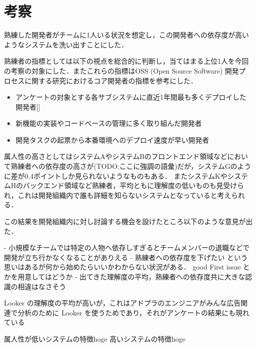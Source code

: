\section{考察}

熟練した開発者がチームに1人いる状況を想定し，この開発者への依存度が高いようなシステムを洗い出すことにした．

熟練者の指標としては以下の視点を総合的に判断し，当てはまる上位1人を今回の考察の対象にした．またこれらの指標はOSS (Open Source Software) 開発プロセスに関する研究\cite{bib:mockus}におけるコア開発者の指標を参考にした．
\begin{itemize}
	\item アンケートの対象とする各サブシステムに直近1年間最も多くデプロイした開発者[]
	\item 新機能の実装やコードベースの管理に多く取り組んだ開発者
	\item 開発タスクの起票から本番環境へのデプロイ速度が早い開発者
\end{itemize}


属人性の高さとしてはシステムAやシステムBのフロントエンド領域などにおいて熟練者への依存度の高さが(TODO:ここに強調の語彙)だが，システムGのように差が0.4ポイントしか見られないようなものもある．
またシステムKやシステムHのバックエンド領域など熟練者，平均ともに理解度の低いものも見受けられ，これは開発組織内で誰も詳細を知らないシステムとなっていると考えられる．

この結果を開発組織内に対し討論する機会を設けたところ以下のような意見が出た．

- 小規模なチームでは特定の人物へ依存しすぎるとチームメンバーの退職などで開発が立ち行かなくなることがありえる
- 熟練者への依存度を下げたい という思いはあるが何から始めたらいいかわからない状況がある． good First issue とかを用意してはどうか
- 出てきた理解度の平均，熟練者への依存度共に大きな認識の相違はなさそう

Looker の理解度の平均が高いが，これはアドプラのエンジニアがみんな広告関連で分析のために Looker を使うためであり，それがアンケートの結果にも現れている



属人性が低いシステムの特徴hoge
高いシステムの特徴hoge




